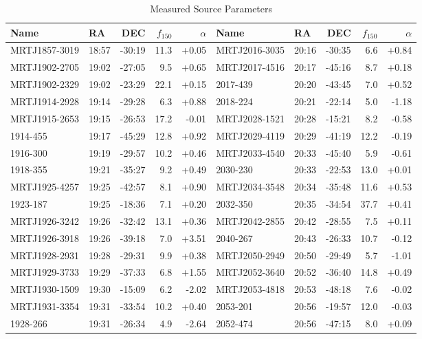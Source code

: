 \documentclass[preprint]{aastex}
\begin{document}
\begin{table}[ht]
\caption{Measured Source Parameters}
\begin{tabular}{l|lrrr||l|lrrr}
\hline
Name & RA & DEC & $f_{150}$ & $\alpha$ & Name & RA & DEC & $f_{150}$ & $\alpha$
\\
\hline
MRTJ1857-3019 & 18:57 & -30:19 &   11.3 & +0.05 & MRTJ2016-3035 & 20:16 & -30:35 &    6.6 & +0.84 \\
MRTJ1902-2705 & 19:02 & -27:05 &    9.5 & +0.65 & MRTJ2017-4516 & 20:17 & -45:16 &    8.7 & +0.18 \\
MRTJ1902-2329 & 19:02 & -23:29 &   22.1 & +0.15 &   2017-439 & 20:20 & -43:45 &    7.0 & +0.52 \\
MRTJ1914-2928 & 19:14 & -29:28 &    6.3 & +0.88 &   2018-224 & 20:21 & -22:14 &    5.0 & -1.18 \\
MRTJ1915-2653 & 19:15 & -26:53 &   17.2 & -0.01 & MRTJ2028-1521 & 20:28 & -15:21 &    8.2 & -0.58 \\
  1914-455 & 19:17 & -45:29 &   12.8 & +0.92 & MRTJ2029-4119 & 20:29 & -41:19 &   12.2 & -0.19 \\
  1916-300 & 19:19 & -29:57 &   10.2 & +0.46 & MRTJ2033-4540 & 20:33 & -45:40 &    5.9 & -0.61 \\
  1918-355 & 19:21 & -35:27 &    9.2 & +0.49 &   2030-230 & 20:33 & -22:53 &   13.0 & +0.01 \\
MRTJ1925-4257 & 19:25 & -42:57 &    8.1 & +0.90 & MRTJ2034-3548 & 20:34 & -35:48 &   11.6 & +0.53 \\
  1923-187 & 19:25 & -18:36 &    7.1 & +0.20 &   2032-350 & 20:35 & -34:54 &   37.7 & +0.41 \\
MRTJ1926-3242 & 19:26 & -32:42 &   13.1 & +0.36 & MRTJ2042-2855 & 20:42 & -28:55 &    7.5 & +0.11 \\
MRTJ1926-3918 & 19:26 & -39:18 &    7.0 & +3.51 &   2040-267 & 20:43 & -26:33 &   10.7 & -0.12 \\
MRTJ1928-2931 & 19:28 & -29:31 &    9.9 & +0.38 & MRTJ2050-2949 & 20:50 & -29:49 &    5.7 & -1.01 \\
MRTJ1929-3733 & 19:29 & -37:33 &    6.8 & +1.55 & MRTJ2052-3640 & 20:52 & -36:40 &   14.8 & +0.49 \\
MRTJ1930-1509 & 19:30 & -15:09 &    6.2 & -2.02 & MRTJ2053-4818 & 20:53 & -48:18 &    7.6 & -0.02 \\
MRTJ1931-3354 & 19:31 & -33:54 &   10.2 & +0.40 &   2053-201 & 20:56 & -19:57 &   12.0 & -0.03 \\
  1928-266 & 19:31 & -26:34 &    4.9 & -2.64 &   2052-474 & 20:56 & -47:15 &    8.0 & +0.09 \\

\end{tabular}
\end{table}
\end{document}
